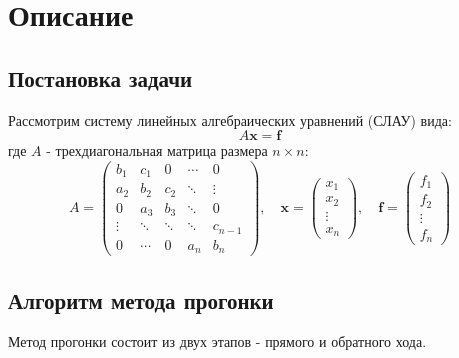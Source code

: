 
\section*{Описание}

\subsection*{Постановка задачи}
Рассмотрим систему линейных алгебраических уравнений (СЛАУ) вида:
\begin{equation}
A\mathbf{x} = \mathbf{f}
\end{equation}
где $A$ - трехдиагональная матрица размера $n \times n$:
\[
A = \begin{pmatrix}
b_1 & c_1 & 0   & \cdots & 0 \\
a_2 & b_2 & c_2 & \ddots & \vdots \\
0   & a_3 & b_3 & \ddots & 0 \\
\vdots & \ddots & \ddots & \ddots & c_{n-1} \\
0 & \cdots & 0 & a_n & b_n
\end{pmatrix}, \quad
\mathbf{x} = \begin{pmatrix} x_1 \\ x_2 \\ \vdots \\ x_n \end{pmatrix}, \quad
\mathbf{f} = \begin{pmatrix} f_1 \\ f_2 \\ \vdots \\ f_n \end{pmatrix}
\]

\subsection*{Алгоритм метода прогонки}
Метод прогонки состоит из двух этапов - прямого и обратного хода.

